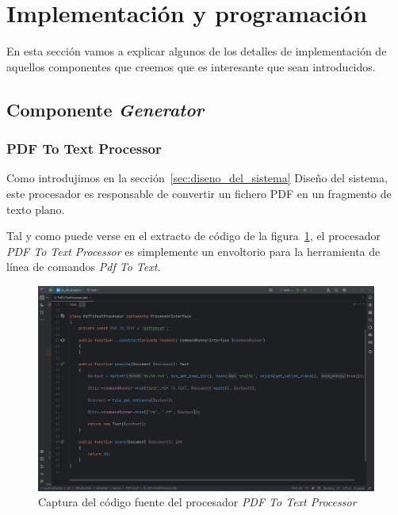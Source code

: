 \section{Implementación y programación}\label{sec:implemetacion_y_programacion}

En esta sección vamos a explicar algunos de los detalles de implementación de aquellos componentes que creemos que es
interesante que sean introducidos.

\subsection*{Componente \textit{Generator}}

\subsubsection*{PDF To Text Processor}

Como introdujimos en la sección~\ref{sec:diseno_del_sistema} Diseño del sistema, este procesador es responsable de
convertir un fichero PDF en un fragmento de texto plano.

Tal y como puede verse en el extracto de código de la figura~\ref{fig:chapter_4.4.pdf_to_text_processor}, el procesador
\textit{PDF To Text Processor} es simplemente un envoltorio para la herramienta de línea de comandos
\textit{Pdf To Text}.

\begin{figure}[ht]
    \begin{center}
        \includegraphics[width=\textwidth]{./chapter/4/images/chapter_4.4.pdf_to_text_processor}
        \caption{Captura del código fuente del procesador \textit{PDF To Text Processor}}
        \label{fig:chapter_4.4.pdf_to_text_processor}
    \end{center}
\end{figure}

